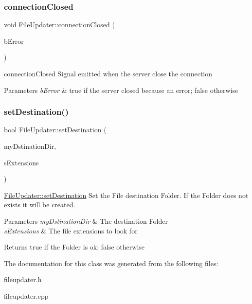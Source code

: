 \subsubsection{\texorpdfstring{connection\+Closed}{connectionClosed}}
{\footnotesize\ttfamily void File\+Updater\+::connection\+Closed (\begin{DoxyParamCaption}\item[{bool}]{b\+Error }\end{DoxyParamCaption})\hspace{0.3cm}{\ttfamily [signal]}}



connection\+Closed Signal emitted when the server close the connection 


\begin{DoxyParams}{Parameters}
{\em b\+Error} & true if the server closed because an error; false otherwise \\
\hline
\end{DoxyParams}
\mbox{\label{classFileUpdater_aad3c90fbc960c8aa84b964f3ae1d8f11}} 
\subsubsection{\texorpdfstring{set\+Destination()}{setDestination()}}
{\footnotesize\ttfamily bool File\+Updater\+::set\+Destination (\begin{DoxyParamCaption}\item[{Q\+String}]{my\+Dstination\+Dir,  }\item[{Q\+String}]{s\+Extensions }\end{DoxyParamCaption})}



\mbox{\hyperlink{classFileUpdater_aad3c90fbc960c8aa84b964f3ae1d8f11}{File\+Updater\+::set\+Destination}} Set the File destination Folder. If the Folder does not exists it will be created. 


\begin{DoxyParams}{Parameters}
{\em my\+Dstination\+Dir} & The destination Folder \\
\hline
{\em s\+Extensions} & The file extensions to look for \\
\hline
\end{DoxyParams}
\begin{DoxyReturn}{Returns}
true if the Folder is ok; false otherwise 
\end{DoxyReturn}


The documentation for this class was generated from the following files\+:\begin{DoxyCompactItemize}
\item 
fileupdater.\+h\item 
fileupdater.\+cpp\end{DoxyCompactItemize}
